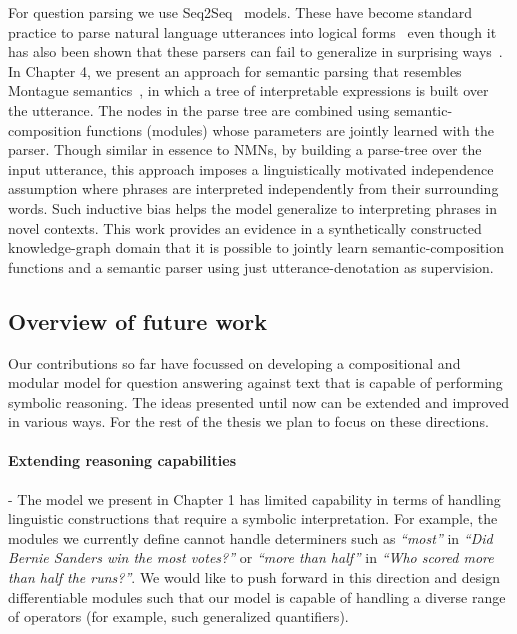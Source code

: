 \documentclass[main.tex]{subfiles}
\begin{document}
For question parsing we use Seq2Seq~\cite{seq2seq-2014,seq2seq-attn-2015} models. These have become standard practice to parse natural language utterances into logical forms~\cite{dong-lapata-2016,krishnamurthy-wikitable-2017,iyer-code-2018} even though it has also been shown that these parsers can fail to generalize in surprising ways~\cite{text2sql-2018,sys-generalization-2018}.
In Chapter 4, we present an approach for semantic parsing that resembles Montague semantics~\cite{montague-semantics}, in which a tree of interpretable expressions is built over the utterance.  The nodes in the parse tree are combined using semantic-composition functions (modules) whose parameters are jointly learned with the parser.  Though similar in essence to NMNs, by building a parse-tree over the input utterance, this approach imposes a linguistically motivated independence assumption where phrases are interpreted independently from their surrounding words.  Such inductive bias helps the model generalize to interpreting phrases in novel contexts.  This work provides an evidence in a synthetically constructed knowledge-graph domain that it is possible to jointly learn semantic-composition functions and a semantic parser using just utterance-denotation as supervision.

\subsection{Overview of future work}

Our contributions so far have focussed on developing a compositional and modular model for question answering against text that is capable of performing symbolic reasoning. The ideas presented until now can be extended and improved in various ways. For the rest of the thesis we plan to focus on these directions.

\paragraph{Extending reasoning capabilities} - The model we present in Chapter 1 has limited capability in terms of handling linguistic constructions that require a symbolic interpretation.  For example, the modules we currently define cannot handle determiners such as \textit{``most''} in \textit{``Did Bernie Sanders win the most votes?''} or \textit{``more than half''} in \textit{``Who scored more than half the runs?''}. We would like to push forward in this direction and design differentiable modules such that our model is capable of handling a diverse range of operators (for example, such generalized quantifiers).
\end{document}
